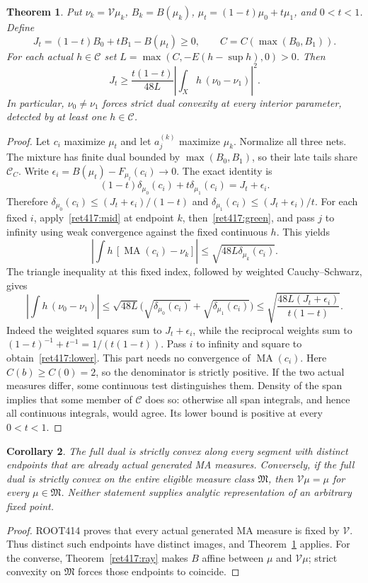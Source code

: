 \documentclass[11pt]{article}
\newtheorem{theorem}{Theorem}
\newtheorem{corollary}[theorem]{Corollary}
\newcommand{\MA}{\operatorname{MA}}
\newcommand{\C}{\mathcal C}
\newcommand{\M}{\mathfrak M}
\newcommand{\V}{\mathcal V}
\begin{document}
\begin{theorem}\label{ret417:jensen}
Put $\nu_k=\V\mu_k$, $B_k=B(\mu_k)$,
$\mu_t=(1-t)\mu_0+t\mu_1$, and $0<t<1$. Define
\[
 J_t=(1-t)B_0+tB_1-B(\mu_t)\ge0,\qquad
 C=C(\max(B_0,B_1)).
\]
For each actual $h\in\C$ set $L=\max(C,-E(h-\sup h),0)>0$.
Then
\begin{equation}\label{ret417:lower}
 J_t\ge\frac{t(1-t)}{48L}
       \left|\int_Xh\,(\nu_0-\nu_1)\right|^2.
\end{equation}
In particular, $\nu_0\ne\nu_1$ forces strict dual convexity
at every interior parameter, detected by at least one $h\in\C$.
\end{theorem}
\begin{proof}
Let $c_i$ maximize $\mu_t$ and let $a_j^{(k)}$ maximize $\mu_k$.
Normalize all three nets. The mixture has finite dual bounded by
$\max(B_0,B_1)$, so their late tails share $\C_C$. Write
$\epsilon_i=B(\mu_t)-F_{\mu_t}(c_i)\to0$. The exact identity is
\[
 (1-t)\delta_{\mu_0}(c_i)+t\delta_{\mu_1}(c_i)=J_t+\epsilon_i.
\]
Therefore $\delta_{\mu_0}(c_i)\le(J_t+\epsilon_i)/(1-t)$ and
$\delta_{\mu_1}(c_i)\le(J_t+\epsilon_i)/t$. For each fixed $i$,
apply~\eqref{ret417:mid} at endpoint $k$, then~\eqref{ret417:green}, and pass
$j$ to infinity using weak convergence against the fixed continuous
$h$. This yields
\[
 \left|\int h\,[\MA(c_i)-\nu_k]\right|
       \le\sqrt{48L\delta_{\mu_k}(c_i)}.
\]
The triangle inequality at this fixed index, followed by weighted
Cauchy--Schwarz, gives
\[
 \left|\int h\,(\nu_0-\nu_1)\right|
 \le\sqrt{48L}\bigl(\sqrt{\delta_{\mu_0}(c_i)}+
                       \sqrt{\delta_{\mu_1}(c_i)}\bigr)
 \le\sqrt{\frac{48L(J_t+\epsilon_i)}{t(1-t)}}.
\]
Indeed the weighted squares sum to $J_t+\epsilon_i$, while the
reciprocal weights sum to $(1-t)^{-1}+t^{-1}=1/(t(1-t))$.
Pass $i$ to infinity and square to obtain~\eqref{ret417:lower}. This
part needs no convergence of $\MA(c_i)$.
Here $C(b)\ge C(0)=2$, so the denominator is strictly positive.
If the two actual measures differ, some continuous test distinguishes
them. Density of the span implies that some member of $\C$ does
so: otherwise all span integrals, and hence all continuous integrals,
would agree. Its lower bound is positive at every $0<t<1$.
\end{proof}

\begin{corollary}
The full dual is strictly convex along every segment with distinct
endpoints that are already actual generated MA measures. Conversely,
if the full dual is strictly convex on the entire eligible measure
class $\M$, then $\V\mu=\mu$ for every $\mu\in\M$.
Neither statement supplies analytic representation of an arbitrary
fixed point.
\end{corollary}
\begin{proof}
ROOT414 proves that every actual generated MA measure is fixed by
$\V$. Thus distinct such endpoints have distinct images, and
Theorem~\ref{ret417:jensen} applies. For the converse,
Theorem~\ref{ret417:ray} makes $B$ affine between $\mu$ and $\V\mu$;
strict convexity on $\M$ forces those endpoints to coincide.
\end{proof}
\end{document}
